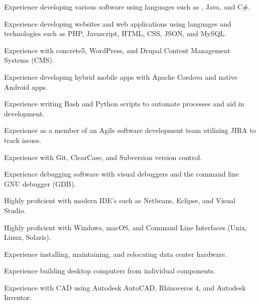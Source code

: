 \begin{itemize*}
  \item Experience developing various software using languages such as \CPP, Java, and C\#.
  \item Experience developing websites and web applications using languages and technologies such as PHP, Javascript, HTML, CSS, JSON, and MySQL.
  \item Experience with concrete5, WordPress, and Drupal Content Management Systems (CMS).
  \item Experience developing hybrid mobile apps with Apache Cordova and native Android apps.
  \item Experience writing Bash and Python scripts to automate processes and aid in development.
  \item Experience as a member of an Agile software development team utilizing JIRA to track issues.
  \item Experience with Git, ClearCase, and Subversion version control.
  \item Experience debugging software with visual debuggers and the command line GNU debugger (GDB).
  \item Highly proficient with modern IDE's such as Netbeans, Eclipse, and Visual Studio.
  \item Highly proficient with Windows, macOS, and Command Line Interfaces (Unix, Linux, Solaris).
  \item Experience installing, maintaining, and relocating data center hardware.
  \item Experience building desktop computers from individual components.
  \item Experience with CAD using Autodesk AutoCAD, Rhinoceros 4, and Autodesk Inventor.
\end{itemize*}


